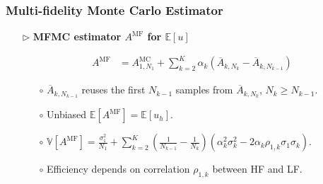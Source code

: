 \documentclass{beamer}
\begin{document}
\begin{frame}[t]
    \frametitle{Multi-fidelity Monte Carlo Estimator}
\begin{itemize}[leftmargin=5pt] 
\item[$\triangleright$]\textcolor{myblue3}{\bf MFMC estimator $A^{\text{MF}}$ for $\mathbb{E}[u]$} 

{\small
\vspace{-5mm}
\begin{align*}
A^{\text{MF}} &= A^{\text{MC}}_{1,N_1} + \sum_{k=2}^K \alpha_k\left(\overline{A}_{k,N_k} - \overline{A}_{k,N_{k-1}} \right) 
\end{align*}
\vspace{-3mm}

\begin{itemize}[leftmargin=15pt] 
    \item[$\circ$] $\overline{A}_{k,N_{k-1}}$ reuses the first $N_{k-1}$ samples from $\overline{A}_{k,N_{k}}$, $N_k\ge N_{k-1}$.
    \item[$\circ$] Unbiased $\mathbb{E}[A^{\text{MF}}] = \mathbb{E}[u_h]$.
    \item[$\circ$] $\mathbb{V}[A^{\text{MF}}]= \frac{\sigma_1^2}{N_1} + \sum_{k=2}^K \left(\frac{1}{N_{k-1}} - \frac{1}{N_k}\right)\left(\alpha_k^2\sigma_k^2 - 2\alpha_k\rho_{1,k}\sigma_1\sigma_k\right)$.
    \item[$\circ$] Efficiency depends on correlation $\rho_{1,k}$ between HF and LF.
\end{itemize}
}

\end{itemize}
\end{frame}




\end{document}
